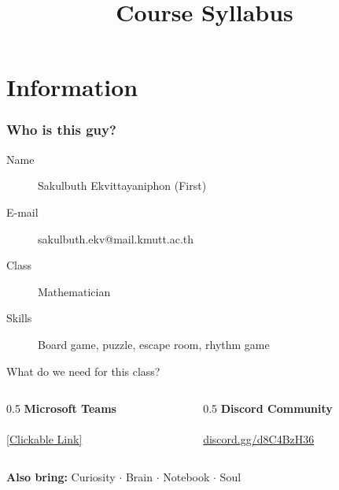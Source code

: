 \title{Course Syllabus}

\frame{\titlepage}

\section{Information}
\frame{\sectionpage}

\begin{frame}
\frametitle{Who is this guy?} 
\begin{description}
\item[Name] Sakulbuth Ekvittayaniphon (First) 
\item[E-mail] sakulbuth.ekv@mail.kmutt.ac.th
\item[Class] Mathematician 
\item[Skills] Board game, puzzle, escape room, rhythm game 
\end{description}
\end{frame}

\begin{frame}{What do we need for this class?}
\begin{columns}
\begin{column}{0.5\textwidth}
\centering
\textbf{Microsoft Teams}\\
\vspace{0.15cm}
\\
\vspace{0.15cm}
{\small \href{https://teams.microsoft.com/l/team/19\%3ANZHoAEfWNVNiw6Z4JCpVAfcfsnGMghla6cT30KBWUTQ1\%40thread.tacv2/conversations?groupId=5d3da82b-30cf-428a-8077-4a15692286ee&tenantId=6f4432dc-20d2-441d-b1db-ac3380ba633d}{[Clickable Link]}}
\end{column}
\begin{column}{0.5\textwidth}
\centering
\textbf{Discord Community}\\
\vspace{0.15cm}
\\
\vspace{0.15cm}
{\small \href{https://discord.gg/d8C4BzH36}{discord.gg/d8C4BzH36}}
\end{column}
\end{columns}
\vspace{0.3cm}
\begin{center}
\small \textbf{Also bring:} Curiosity $\cdot$ Brain $\cdot$ Notebook $\cdot$ Soul
\end{center}
\end{frame}

